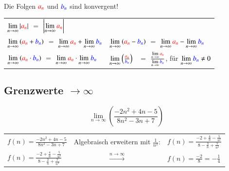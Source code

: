 Die Folgen ${\textcolor{red}{a_n}}$ und ${\textcolor{blue}{b_n}}$ sind konvergent!\vspace{0.5em}
\\
\renewcommand{\arraystretch}{2}
\begin{tabular}{ll}
    $\lim\limits_{n \to \infty} \left|\textcolor{red}{a_n}\right|$ \quad \;\;\; $=$   $\left|\lim\limits_{n \to \infty} \textcolor{red}{a_n}\right| $\\

    $\lim\limits_{n \to \infty} \left(\textcolor{red}{a_n} + \textcolor{blue}{b_n}\right)$  $=$   $\lim\limits_{n \to \infty} \textcolor{red}{a_n} + \lim\limits_{n \to \infty} \textcolor{blue}{b_n}$ &
    $\lim\limits_{n \to \infty} \left(\textcolor{red}{a_n} - \textcolor{blue}{b_n}\right)$  $=$   $\lim\limits_{n \to \infty} \textcolor{red}{a_n} - \lim\limits_{n \to \infty} \textcolor{blue}{b_n}$\\
    
    $\lim\limits_{n \to \infty} \left(\textcolor{red}{a_n} \cdot \textcolor{blue}{b_n}\right)$ \; $=$   $\lim\limits_{n \to \infty} \textcolor{red}{a_n} \cdot \lim\limits_{n \to \infty} \textcolor{blue}{b_n}$ &
    $\lim\limits_{n \to \infty} \left(\frac{\textcolor{red}{a_n}}{\textcolor{blue}{b_n}}\right)$ \quad \;\:\, $=$   $\frac{\lim\limits_{n \to \infty} \textcolor{red}{a_n}}{\lim\limits_{n \to \infty} \textcolor{blue}{b_n}}$, \quad für $\lim\limits_{n \to \infty} \textcolor{blue}{b_n} \neq 0$ 
\end{tabular}


\subsection{Grenzwerte \texorpdfstring{$\longrightarrow \infty$}{→ ∞}}
\[
    \lim\limits_{n \to \infty}\left(\frac{-2n^2+4n-5}{8n^2-3n+7}\right)
\]
\begin{tabular}{lcl}
    $ \displaystyle{f(n)= \frac{-2n^2+4n-5}{8n^2-3n+7}}$                    & Algebraisch erweitern mit $\frac{1}{n^2}$: & $\displaystyle{f(n)=\frac{-2+\frac{4}{n}-\frac{5}{n^2}}{8-\frac{3}{n}+\frac{7}{n^2}}}$\\
    $ \displaystyle{f(n)=\frac{-2+\frac{4}{n}-\frac{5}{n^2}}{8-\frac{3}{n}+\frac{7}{n^2}}}$ & $\xrightarrow{n \to \infty}$               & $\displaystyle{f(n)=\frac{-2}{8} = -\frac{1}{4}}$
\end{tabular}\\

